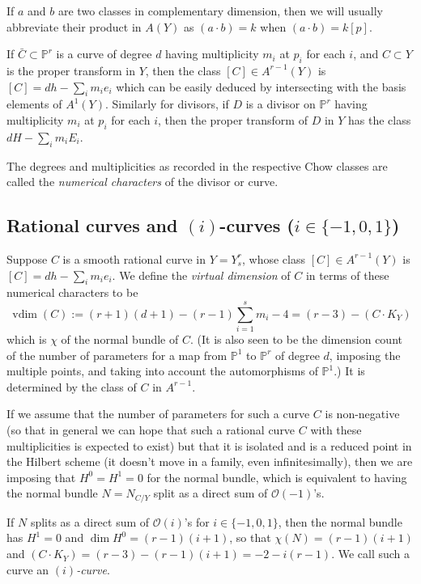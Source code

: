 \documentclass[12pt]{article}
\numberwithin{equation}{section}
\numberwithin{equation}{section}
\numberwithin{subeq}{equation}
\def\calO{\mathcal{O}}
\def\bbP{\mathbb{P}}
\newcommand{\vdim}{\operatorname{vdim}}
\begin{document}
If $a$ and $b$ are two classes in complementary dimension,
then we will usually abbreviate their product in $A(Y)$ as $(a\cdot b) = k$
when $(a \cdot b) = k [p]$.

If $\bar{C} \subset \bbP^r$ is a curve of degree $d$
having multiplicity $m_i$ at $p_i$ for each $i$,
and $C \subset Y$ is the proper transform in $Y$,
then the class $[C] \in A^{r-1}(Y)$ is
$
[C] = d h - \sum_i m_i e_{i}
$
which can be easily deduced by intersecting with the basis elements of $A^1(Y)$.
Similarly for divisors, if $D$ is a divisor on $\bbP^r$
having multiplicity $m_i$ at $p_i$ for each $i$,
then the proper transform of $D$ in $Y$ has the class $d H - \sum_i m_i E_i$.

The degrees and multiplicities as recorded in the respective Chow classes
are called the \emph{numerical characters} of the divisor or curve.

\subsection{Rational curves and $(i)$-curves ($i \in \{-1,0,1\}$)}
\label{rationalcurves(i)curves}
Suppose $C$ is a smooth rational curve in $Y=Y^r_s$,
whose class $[C] \in A^{r-1}(Y)$ is $[C]=d h - \sum_i m_i e_i$.
We define the \emph{virtual dimension} of $C$
in terms of these numerical characters to be
\begin{equation}\label{param}
\vdim(C):=(r+1)(d+1) - (r-1)\sum_{i=1}^s m_i - 4 = (r-3)-(C\cdot K_Y)
\end{equation}
which is $\chi$ of the normal bundle of $C$.
(It is also seen to be the dimension count of the number of parameters for a map from $\bbP^1$ to $\bbP^r$ of degree $d$, imposing the multiple points,
and taking into account the automorphisms of $\bbP^1$.)
It is determined by the class of $C$ in $A^{r-1}$.

If we assume that the number of parameters for such a curve $C$ is non-negative
(so that in general we can hope that
such a rational curve $C$ with these multiplicities is expected to exist)
but that it is isolated and is a reduced point in the Hilbert scheme
(it doesn't move in a family, even infinitesimally),
then we are imposing that $H^0 = H^1 = 0$ for the normal bundle,
which is equivalent to having the normal bundle  $N = N_{C/Y}$
split as a direct sum of $\calO(-1)$'s.

If $N$ splits as a direct sum of $\calO(i)$'s for $i \in \{-1,0,1\}$,
then the normal bundle has $H^1=0$ and $\dim H^0 = (r-1)(i+1)$,
so that $\chi(N) = (r-1)(i+1)$
and $(C\cdot K_Y) = (r-3)-(r-1)(i+1) = -2-i(r-1)$.
We call such a curve an \emph{$(i)$-curve}.
\end{document}
